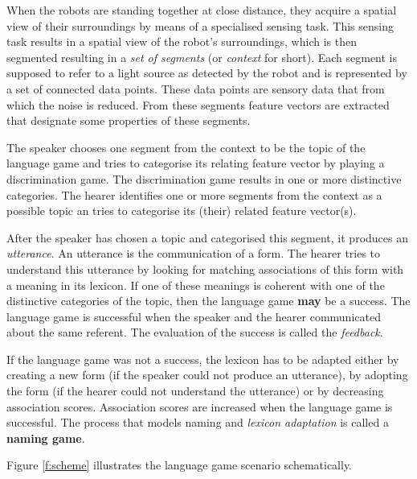 When the robots are standing together at close distance, they acquire a spatial view of their surroundings by means of a specialised sensing task. This sensing task results in a spatial view of the robot's surroundings, which is then segmented resulting in a {\em set of segments} (or {\em context} for short). Each segment is supposed to refer to a light source as detected by the robot and is represented by a set of connected data points. These data points are sensory data that from which the noise is reduced. From these segments feature vectors are extracted that designate some properties of these segments. 

The speaker chooses one segment from the context to be the topic of the language game and tries to categorise its relating feature vector by playing a discrimination game. The discrimination game results in one or more distinctive categories. The hearer identifies one or more segments from the context as a possible topic an tries to categorise its (their) related feature vector(s).

After the speaker has chosen a topic and categorised this segment, it produces an {\em utterance}. An utterance is the communication of a form. The hearer tries to understand this utterance  by looking for matching associations of this form with a meaning in its lexicon. If one of these meanings is coherent with one of the distinctive categories of the topic, then the language game {\bf may} be a success. The language game is successful when the speaker and the hearer communicated about the same referent. The evaluation of the success is called the {\em feedback}.

If the language game was not a success, the lexicon has to be adapted either by creating a new form (if the speaker could not produce an utterance), by adopting the form (if the hearer could not understand the utterance) or by decreasing association scores. Association scores are increased when the language game is successful. The process that models naming and {\em lexicon adaptation} is called a {\bf naming game}.

Figure \ref{f:scheme} illustrates the language game scenario schematically.

